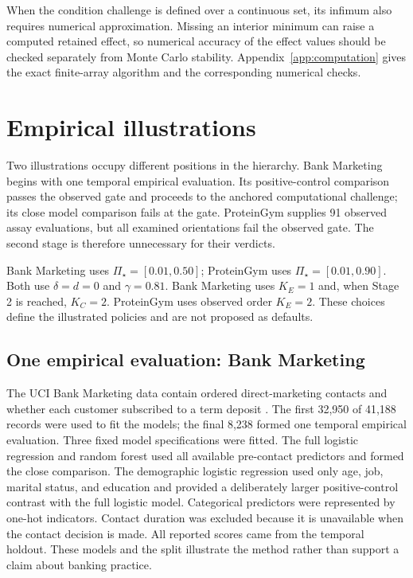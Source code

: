 \documentclass[11pt]{article}
\newcommand{\PSet}{\Pi_\star}
\theoremstyle{remark}
\begin{document}
When the condition challenge is defined over a continuous set, its infimum
also requires numerical approximation. Missing an interior minimum can raise a
computed retained effect, so numerical accuracy of the effect values should be
checked separately from Monte Carlo stability. Appendix~\ref{app:computation}
gives the exact finite-array algorithm and the corresponding numerical checks.

\section{Empirical illustrations}
\label{sec:illustrations}

Two illustrations occupy different positions in the hierarchy. Bank
Marketing begins with one temporal empirical evaluation. Its positive-control
comparison passes the observed gate and proceeds to the anchored computational
challenge; its close model comparison fails at the gate. ProteinGym supplies
91 observed assay evaluations, but all examined orientations fail the observed
gate. The second stage is therefore unnecessary for their verdicts.

Bank Marketing uses $\PSet=[0.01,0.50]$; ProteinGym uses
$\PSet=[0.01,0.90]$. Both use $\delta=d=0$ and $\gamma=0.81$. Bank
Marketing uses $K_E=1$ and, when Stage 2 is reached, $K_C=2$. ProteinGym
uses observed order $K_E=2$. These choices define the illustrated policies
and are not proposed as defaults.

\subsection{One empirical evaluation: Bank Marketing}
\label{sec:bank-illustration}

The UCI Bank Marketing data contain ordered direct-marketing contacts and
whether each customer subscribed to a term deposit \cite{moro2014bank}. The
first 32,950 of 41,188 records were used to fit the models; the final 8,238
formed one temporal empirical evaluation. Three fixed model specifications were
fitted. The full logistic regression and random forest used all available
pre-contact predictors and formed the close comparison. The demographic
logistic regression used only age, job, marital status, and education and
provided a deliberately larger positive-control contrast with the full
logistic model. Categorical predictors were represented by one-hot indicators.
Contact duration was excluded because it is unavailable when the contact
decision is made. All reported scores came from the temporal holdout. These
models and the split illustrate the method rather than support a claim about
banking practice.
\end{document}
